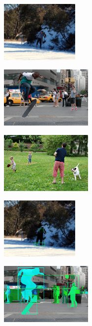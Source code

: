 \begin{figure}[!htbp]
    \centering %
\begin{subfigure}[t]{0.3\textwidth}
  \includegraphics[height=3cm, width=\linewidth]{figures/original/000000096825.jpeg}
\end{subfigure}\hfil %
\begin{subfigure}[t]{0.3\textwidth}
  \includegraphics[height=3cm, width=\linewidth]{figures/original/000000171382.jpeg}
\end{subfigure} %
\begin{subfigure}[t]{0.3\textwidth}
  \includegraphics[height=3cm, width=\linewidth]{figures/original/000000509403.jpeg}
\end{subfigure}\hfil
\vspace{5mm}
\begin{subfigure}[t]{0.3\textwidth}
  \includegraphics[height=3cm, width=\linewidth]{figures/segm_bbox/ground_truth/000000096825_segm_bbox.jpeg}
\end{subfigure} %
\begin{subfigure}[t]{0.3\textwidth}
  \includegraphics[height=3cm, width=\linewidth]{figures/segm_bbox/ground_truth/000000171382_segm_bbox.jpeg}

\end{subfigure}
\end{figure}
